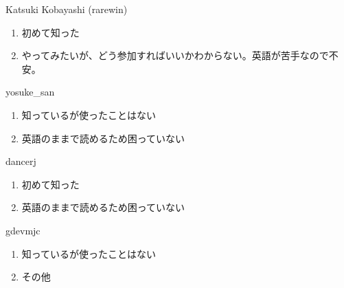 \begin{prework}{ Katsuki Kobayashi (rarewin) }
  \begin{enumerate}
  \item 初めて知った
  \item やってみたいが、どう参加すればいいかわからない。英語が苦手なので不安。
  \end{enumerate}
\end{prework}

\begin{prework}{ yosuke\_san }
  \begin{enumerate}
  \item 知っているが使ったことはない
  \item 英語のままで読めるため困っていない
  \end{enumerate}
\end{prework}

\begin{prework}{ dancerj }
  \begin{enumerate}
  \item 初めて知った
  \item 英語のままで読めるため困っていない
  \end{enumerate}
\end{prework}

\begin{prework}{ gdevmjc }
  \begin{enumerate}
  \item 知っているが使ったことはない
  \item その他
  \end{enumerate}
\end{prework}
